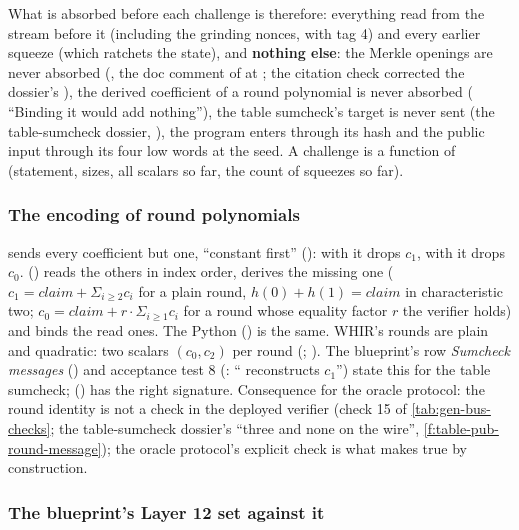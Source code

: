 What is absorbed before each challenge is therefore: everything read from the stream before it
(including the grinding nonces, with tag 4) and every earlier squeeze (which ratchets the state),
and \textbf{nothing else}: the Merkle openings are never absorbed (,
the doc comment of  at ; the citation check corrected the dossier's
),
the derived coefficient of a round polynomial is never absorbed ( ``Binding it would
add nothing''), the table sumcheck's target is never sent (the table-sumcheck dossier,
), the program enters through its hash and the public input through its four
low words at the seed. A challenge is a function of (statement, sizes, all scalars so far, the
count of squeezes so far).

\subsubsection{The encoding of round polynomials}\label{sec:gen-opening-rounds}

 sends every coefficient but one, ``constant first''
(): with  it drops $c_1$, with  it drops
$c_0$.  () reads the others in index order,
derives the missing one ($c_1 = \mathit{claim} + Σ_{i≥2} c_i$ for a plain round,
$h(0) + h(1) = \mathit{claim}$ in characteristic two; $c_0 = \mathit{claim} + r·Σ_{i≥1} c_i$ for a
round whose equality factor $r$ the verifier holds) and binds the read ones. The Python
 () is the same. WHIR's rounds are plain and quadratic:
two scalars $(c_0, c_2)$ per round (; ). The blueprint's row
\emph{Sumcheck messages} () and acceptance test 8 (: ``
reconstructs $c_1$'') state this for the table sumcheck; 
() has the right signature. Consequence for the oracle protocol: the round identity
is not a check in the deployed verifier (check 15 of \cref{tab:gen-bus-checks}; the table-sumcheck
dossier's ``three and none on the wire'', \cref{f:table-pub-round-message}); the oracle protocol's
explicit check is what  makes true by construction.

\subsubsection{The blueprint's Layer 12 set against it}\label{sec:gen-opening-blueprint-layer12}

